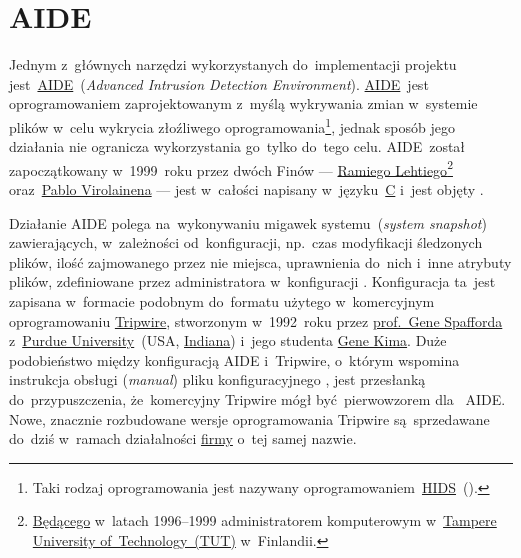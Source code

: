 \documentclass[thesis]{subfiles}
\begin{document}

\section{AIDE}
\label{sec:aide}

Jednym z~głównych narzędzi wykorzystanych do~implementacji projektu jest~\href{http://aide.sourceforge.net/}{AIDE}~(\emph{Advanced Intrusion Detection Environment}). \href{https://wiki.archlinux.org/index.php/AIDE}{AIDE}~jest oprogramowaniem zaprojektowanym z~myślą wykrywania zmian w~systemie plików w~celu wykrycia złoźliwego oprogramowania\footnote{Taki rodzaj oprogramowania jest nazywany oprogramowaniem~\href{https://en.wikipedia.org/wiki/Host-based_intrusion_detection_system_comparison}{HIDS}~().}, jednak sposób jego działania nie ogranicza wykorzystania go~tylko do~tego celu. AIDE~został zapoczątkowany w~1999~roku przez dwóch Finów --- \href{http://www.ipi.fi/~rammer/cv.html}{Ramiego Lehtiego}\footnote{\href{http://www.ipi.fi/~rammer/cv.html}{Będącego} w~latach 1996--1999 administratorem komputerowym w~\href{http://www.tut.fi/en}{Tampere University of~Technology~(TUT)} w~Finlandii.} oraz~\href{https://www.linkedin.com/in/pablo-virolainen-73501731/}{Pablo Virolainena} --- jest w~całości napisany w~języku~\href{https://en.wikipedia.org/wiki/C_(programming_language)}{C} i~jest objęty .

Działanie AIDE polega na~wykonywaniu migawek systemu~(\emph{system snapshot}) zawierających, w~zależności od~konfiguracji, np.~czas modyfikacji śledzonych plików, ilość zajmowanego przez nie miejsca, uprawnienia do~nich i~inne atrybuty plików, zdefiniowane przez administratora w~konfiguracji \href{https://linux.die.net/man/5/aide.conf}{}. Konfiguracja ta~jest zapisana w~formacie podobnym do~formatu użytego w~komercyjnym oprogramowaniu \href{https://en.wikipedia.org/wiki/Open_Source_Tripwire}{Tripwire}, stworzonym w~1992~roku przez \href{https://en.wikipedia.org/wiki/Gene_Spafford}{prof.~Gene Spafforda} z~\href{https://en.wikipedia.org/wiki/Purdue_University}{Purdue University}~(USA, \href{https://en.wikipedia.org/wiki/Indiana}{Indiana}) i~jego studenta \href{https://en.wikipedia.org/wiki/Gene_Kim}{Gene Kima}. Duże podobieństwo między konfiguracją AIDE i~Tripwire, o~którym wspomina instrukcja obsługi (\emph{\gls{manual}}) pliku konfiguracyjnego , jest przesłanką do~przypuszczenia, że~komercyjny Tripwire mógł być~pierwowzorem dla~ AIDE. Nowe, znacznie rozbudowane wersje oprogramowania Tripwire są~sprzedawane do~dziś w~ramach działalności \href{https://en.wikipedia.org/wiki/Tripwire_(company)}{firmy} o~tej samej nazwie.
\end{document}
